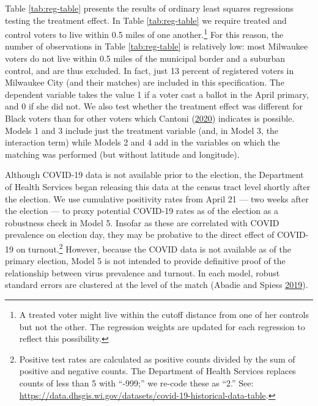 \documentclass[
  12pt,
]{article}
\begin{document}
Table \ref{tab:reg-table} presents the results of ordinary least squares regressions testing the treatment effect. In Table \ref{tab:reg-table} we require treated and control voters to live within 0.5 miles of one another.\footnote{A treated voter might live within the cutoff distance from one of her controls but not the other. The regression weights are updated for each regression to reflect this possibility.} For this reason, the number of observations in Table \ref{tab:reg-table} is relatively low: most Milwaukee voters do not live within 0.5 miles of the municipal border and a suburban control, and are thus excluded. In fact, just 13 percent of registered voters in Milwaukee City (and their matches) are included in this specification. The dependent variable takes the value 1 if a voter cast a ballot in the April primary, and 0 if she did not. We also test whether the treatment effect was different for Black voters than for other voters which Cantoni (\protect\hyperlink{ref-Cantoni2020}{2020}) indicates is possible. Models 1 and 3 include just the treatment variable (and, in Model 3, the interaction term) while Models 2 and 4 add in the variables on which the matching was performed (but without latitude and longitude).

Although COVID-19 data is not available prior to the election, the Department of Health Services began releasing this data at the census tract level shortly after the election. We use cumulative positivity rates from April 21 --- two weeks after the election --- to proxy potential COVID-19 rates as of the election as a robustness check in Model 5. Insofar as these are correlated with COVID prevalence on election day, they may be probative to the direct effect of COVID-19 on turnout.\footnote{Positive test rates are calculated as positive counts divided by the sum of positive and negative counts. The Department of Health Services replaces counts of less than 5 with ``-999;'' we re-code these as ``2.'' See: \url{https://data.dhsgis.wi.gov/datasets/covid-19-historical-data-table}.} However, because the COVID data is not available as of the primary election, Model 5 is not intended to provide definitive proof of the relationship between virus prevalence and turnout. In each model, robust standard errors are clustered at the level of the match (Abadie and Spiess \protect\hyperlink{ref-Abadie2019}{2019}).

\begin{singlespace}


\end{singlespace}
\end{document}
